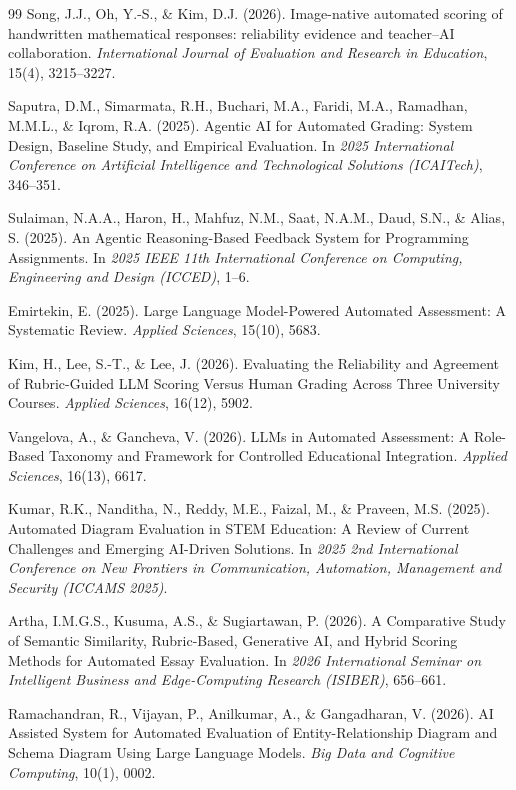 \documentclass[11pt,a4paper]{article}
\begin{document}
\begin{thebibliography}{99}
Song, J.J., Oh, Y.-S., \& Kim, D.J. (2026). Image-native automated scoring of handwritten mathematical responses: reliability evidence and teacher--AI collaboration. \textit{International Journal of Evaluation and Research in Education}, 15(4), 3215--3227.

Saputra, D.M., Simarmata, R.H., Buchari, M.A., Faridi, M.A., Ramadhan, M.M.L., \& Iqrom, R.A. (2025). Agentic AI for Automated Grading: System Design, Baseline Study, and Empirical Evaluation. In \textit{2025 International Conference on Artificial Intelligence and Technological Solutions (ICAITech)}, 346--351.

Sulaiman, N.A.A., Haron, H., Mahfuz, N.M., Saat, N.A.M., Daud, S.N., \& Alias, S. (2025). An Agentic Reasoning-Based Feedback System for Programming Assignments. In \textit{2025 IEEE 11th International Conference on Computing, Engineering and Design (ICCED)}, 1--6.

Emirtekin, E. (2025). Large Language Model-Powered Automated Assessment: A Systematic Review. \textit{Applied Sciences}, 15(10), 5683.

Kim, H., Lee, S.-T., \& Lee, J. (2026). Evaluating the Reliability and Agreement of Rubric-Guided LLM Scoring Versus Human Grading Across Three University Courses. \textit{Applied Sciences}, 16(12), 5902.

Vangelova, A., \& Gancheva, V. (2026). LLMs in Automated Assessment: A Role-Based Taxonomy and Framework for Controlled Educational Integration. \textit{Applied Sciences}, 16(13), 6617.

Kumar, R.K., Nanditha, N., Reddy, M.E., Faizal, M., \& Praveen, M.S. (2025). Automated Diagram Evaluation in STEM Education: A Review of Current Challenges and Emerging AI-Driven Solutions. In \textit{2025 2nd International Conference on New Frontiers in Communication, Automation, Management and Security (ICCAMS 2025)}.

Artha, I.M.G.S., Kusuma, A.S., \& Sugiartawan, P. (2026). A Comparative Study of Semantic Similarity, Rubric-Based, Generative AI, and Hybrid Scoring Methods for Automated Essay Evaluation. In \textit{2026 International Seminar on Intelligent Business and Edge-Computing Research (ISIBER)}, 656--661.

Ramachandran, R., Vijayan, P., Anilkumar, A., \& Gangadharan, V. (2026). AI Assisted System for Automated Evaluation of Entity-Relationship Diagram and Schema Diagram Using Large Language Models. \textit{Big Data and Cognitive Computing}, 10(1), 0002.


\end{thebibliography}
\end{document}
